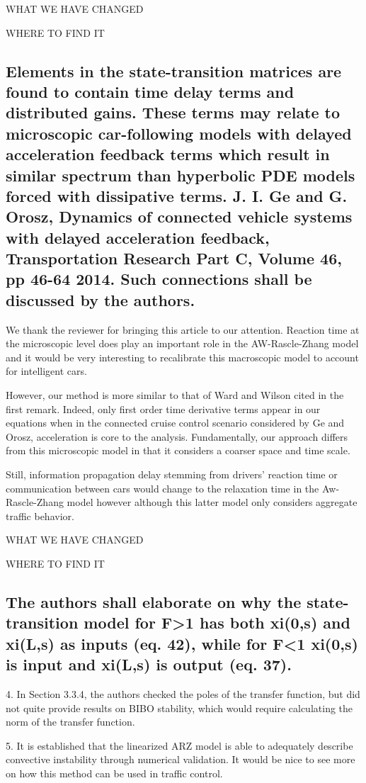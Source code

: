 \documentclass[preprint]{elsarticle}
\begin{document}
WHAT WE HAVE CHANGED

WHERE TO FIND IT

\subsection{Elements in the state-transition matrices are found to contain time delay terms and distributed gains. These terms may relate to microscopic car-following models with delayed acceleration feedback terms which result in similar spectrum than hyperbolic PDE models forced with dissipative terms. J. I. Ge and G. Orosz, Dynamics of connected vehicle systems with delayed acceleration feedback, Transportation Research Part C, Volume 46, pp 46-64 2014. Such connections shall be discussed by the authors.}
We thank the reviewer for bringing this article to our attention. Reaction time at the microscopic level does play an important role in the AW-Rascle-Zhang model and it would be very interesting to recalibrate this macroscopic model to account for intelligent cars. 

However, our method is more similar to that of Ward and Wilson cited in the first remark. Indeed, only first order time derivative terms appear in our equations when in the connected cruise control scenario considered by Ge and Orosz, acceleration is core to the analysis. Fundamentally, our approach differs from this microscopic model in that it considers a coarser space and time scale. 

Still, information propagation delay stemming from drivers' reaction time or communication between cars would change to the relaxation time in the Aw-Rascle-Zhang model however although this latter model only considers aggregate traffic behavior.

WHAT WE HAVE CHANGED

WHERE TO FIND IT


\subsection{The authors shall elaborate on why the state-transition model for F>1 has both xi(0,s) and xi(L,s) as inputs (eq. 42), while for F<1 xi(0,s) is input and xi(L,s) is output (eq. 37).}


4. In Section 3.3.4, the authors checked the poles of the transfer function, but did not quite provide results on BIBO stability, which would require calculating the norm of the transfer function.

5. It is established that the linearized ARZ model is able to adequately describe convective instability through numerical validation. It would be nice to see more on how this method can be used in traffic control.
\end{document}
